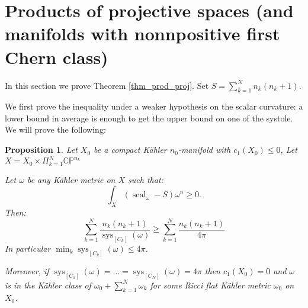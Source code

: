 \documentclass{amsart}
\newtheorem{proposition}[theorem]{Proposition}
\numberwithin{equation}{section}
\theoremstyle{definition}
\DeclareMathOperator{\scal}{scal}
\DeclareMathOperator{\sys}{sys}
\begin{document}
\section{Products of projective spaces (and manifolds with nonnpositive first Chern class)}

In this section we prove Theorem \ref{thm_prod_proj}.
Set $S=\sum_{k=1}^N n_k(n_k+1)$.

We first prove the inequality under a weaker hypothesis on the scalar curvature: a lower bound in average is enough to get the upper bound on one of the systole. We will prove the following:
\begin{proposition}
    \label{thm_prod_proj_avg}
    Let $X_0$ be a compact K\"ahler $n_0$-manifold with $c_1(X_0)\leq 0$, %
    Let $X=X_0\times\Pi_{k=1}^N\mathbb{CP}^{n_k}$ %

    Let $\omega$ be any K\"ahler metric on $X$ such that:
    \[\int_X(\scal_\omega-S)\omega^n\geq 0.\]
    Then:
    \[\sum_{k=1}^N\frac{n_k(n_k+1)}{\sys_{[C_k]}(\omega)}\geq \sum_{k=1}^N \frac{n_k(n_k+1)}{4\pi}\]
    In particular $\min_k \sys_{[C_k]}(\omega) \leq 4\pi$.

    Moreover, if $\sys_{[C_1]}(\omega)=\dots= \sys_{[C_N]}(\omega)=4\pi$ then $c_1(X_0)=0$ and $\omega$ is in the K\"ahler class of $\omega_0+\sum_{k=1}^N\omega_k$ for some Ricci flat K\"ahler metric $\omega_0$ on $X_0$.
\end{proposition}
\end{document}
